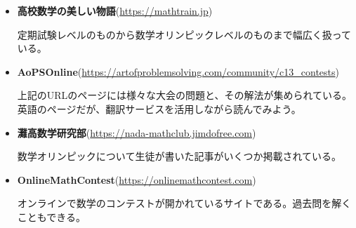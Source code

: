 \documentclass[uplatex,dvipdfmx]{jsbook}
\begin{document}
\begin{itemize}
    \item \textbf{高校数学の美しい物語}(\url{https://mathtrain.jp})

    定期試験レベルのものから数学オリンピックレベルのものまで幅広く扱っている。

    \item \textbf{AoPSOnline}(\url{https://artofproblemsolving.com/community/c13_contests})

    上記のURLのページには様々な大会の問題と、その解法が集められている。英語のページだが、翻訳サービスを活用しながら読んでみよう。

    \item \textbf{灘高数学研究部}(\url{https://nada-mathclub.jimdofree.com})

    数学オリンピックについて生徒が書いた記事がいくつか掲載されている。

    \item \textbf{OnlineMathContest}(\url{https://onlinemathcontest.com})

    オンラインで数学のコンテストが開かれているサイトである。過去問を解くこともできる。
\end{itemize}
\end{document}
